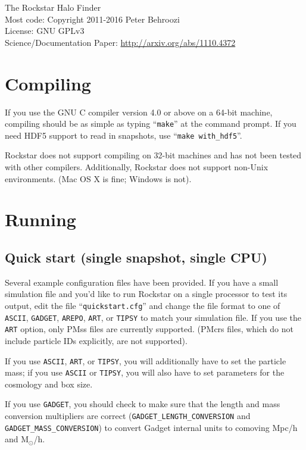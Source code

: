 \documentclass[12pt]{article}
\begin{document}
\vspace{-1ex}
\noindent{}The Rockstar Halo Finder\\
\noindent{}Most code: Copyright \textcopyright{}2011-2016 Peter Behroozi\\
\noindent{}License: GNU GPLv3\\
\noindent{}Science/Documentation Paper: \url{http://arxiv.org/abs/1110.4372}\\

\tableofcontents
\newcommand{\ttt}[1]{\texttt{#1}}

\section{Compiling}
   If you use the GNU C compiler version 4.0 or above on a 64-bit machine,
   compiling should be as simple as typing ``\texttt{make}'' at the command prompt.
   If you need HDF5 support to read in snapshots, use ``\ttt{make with\_hdf5}''.

   Rockstar does not support compiling on 32-bit machines and has not been
   tested with other compilers.  Additionally, Rockstar does not support
   non-Unix environments.  (Mac OS X is fine; Windows is not).

\section{Running}
   \subsection{Quick start (single snapshot, single CPU)}
      Several example configuration files have been provided.  If you have a
      small simulation file and you'd like to run Rockstar on a single processor
      to test its output, edit the file ``\texttt{quickstart.cfg}'' and change the file
      format to one of \texttt{ASCII}, \texttt{GADGET}, \texttt{AREPO}, \texttt{ART}, 
      or \texttt{TIPSY} to match your simulation file.  If you use the \texttt{ART} option,
      only PMss files are currently supported.  (PMcrs files, which do not include particle IDs
      explicitly, are not supported).

      If you use \texttt{ASCII}, \ttt{ART}, or \ttt{TIPSY}, you will additionally have to set
      the particle mass; if you use \ttt{ASCII} or \ttt{TIPSY}, you will also have to
      set parameters for the cosmology and box size.

      If you use \texttt{GADGET}, you should check to make sure that the length
      and mass conversion multipliers are correct (\ttt{GADGET\_LENGTH\_CONVERSION} and
      \ttt{GADGET\_MASS\_CONVERSION}) to convert Gadget internal units to comoving Mpc/h
      and M$_\odot$/h.
      
\end{document}
